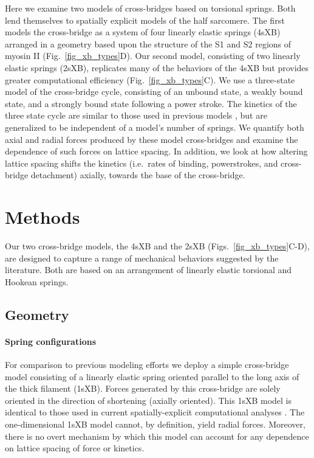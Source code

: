 \documentclass[]{article}
\begin{document}
Here we examine two models of cross-bridges based on torsional springs.  
Both lend themselves to spatially explicit models of the half sarcomere. 
The first models the cross-bridge as a system of  four linearly elastic springs (4sXB) arranged in a geometry based upon the structure of the S1 and S2 regions of myosin II (Fig.~\ref{fig_xb_types}D). 
Our second model, consisting of two linearly elastic springs (2sXB), replicates many of the behaviors of the 4sXB but provides greater computational efficiency (Fig.~\ref{fig_xb_types}C). 
We use a three-state model of the cross-bridge cycle, consisting of an unbound state, a weakly bound state, and a strongly bound state following a power stroke. 
The kinetics of the three state cycle are similar to those used in previous models \citep{Pate1989, Daniel1998, Tanner2007}, but are generalized to be independent of a model's number of springs.
We quantify both axial and radial forces produced by these model cross-bridges and examine the dependence of such forces on lattice spacing.
In addition, we look at how altering lattice spacing shifts the kinetics (i.e.\ rates of binding, powerstrokes, and cross-bridge detachment) axially, towards the base of the cross-bridge. 




\section{Methods}  %

Our two cross-bridge models, the 4sXB and the 2sXB (Figs.~\ref{fig_xb_types}C-D), are designed to capture a range of mechanical behaviors suggested by the literature.  
Both are based on an arrangement of linearly elastic torsional and Hookean springs.  

\subsection*{Geometry} %

\paragraph{Spring configurations} %
For comparison to previous modeling efforts we deploy a simple cross-bridge model consisting of a linearly elastic spring oriented parallel to the long axis of the thick filament (1sXB).  
Forces generated by this cross-bridge are solely oriented in the direction of shortening (axially oriented). 
This 1sXB model is identical to those used in current spatially-explicit computational analyses \citep{Daniel1998, Chase2004, Tanner2007}. 
The one-dimensional 1sXB model cannot, by definition, yield radial forces.  
Moreover, there is no overt mechanism by which this model can account for any dependence on lattice spacing of force or kinetics.
\end{document}
